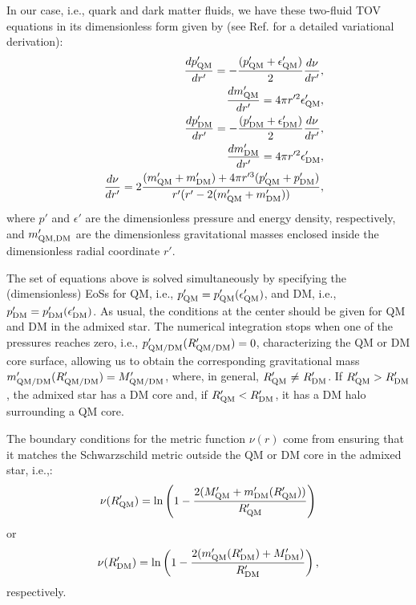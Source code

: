 \documentclass[universe,article,accept,moreauthors,pdftex]{Definitions/mdpi}
\begin{document}
In our case, i.e., quark and dark matter fluids, we have these two-fluid TOV equations in its dimensionless form given by \cite{Tolos:2015qra} (see Ref. \cite{Xiang:2013xwa} for a detailed variational derivation):
%
\begin{eqnarray}
&&\frac{dp'_{\rm QM}}{dr'}=-\frac{(p'_{\rm QM}+\epsilon'_{\rm QM})}{2}\frac{d \nu}{dr'}, \nonumber \\
&&\frac{dm'_{\rm QM}}{dr'}=4 \pi r'^2 \epsilon'_{\rm QM}, \nonumber \\
&&\frac{dp'_{\rm DM}}{dr'}=-\frac{(p'_{\rm DM}+\epsilon'_{\rm DM})}{2}\frac{d \nu}{dr'},  \\
&&\frac{dm'_{\rm DM}}{dr'}=4 \pi r'^2 \epsilon'_{\rm DM}, \nonumber \\
&&\frac{d \nu}{dr'}=2\frac{(m'_{\rm QM}+m'_{\rm DM}) + 4 \pi r'^3(p'_{\rm QM}+p'_{\rm DM})}{r'(r'-2(m'_{\rm QM}+m'_{\rm DM}))}, \nonumber
\label{eq:2TOV}
\end{eqnarray}
%
where $p'$ and $\epsilon'$ are the dimensionless pressure and energy density, respectively, and $m'_{\rm QM, DM}$ are the dimensionless gravitational masses enclosed inside the dimensionless radial coordinate $r'$. 

The set of equations above is solved simultaneously by specifying the (dimensionless) EoSs for QM, i.e., $p'_{\rm QM}=p'_{\rm QM}(\epsilon'_{\rm QM})$, and DM, i.e.,  $p'_{\rm DM}=p'_{\rm DM}(\epsilon'_{\rm DM})$. As usual, the \linebreak conditions at the center should be given for QM and DM in the admixed star. The numerical integration stops when one of the pressures reaches zero, i.e., \linebreak $p'_{\rm QM/DM}(R'_{\rm QM/DM})=0$, characterizing the QM or DM core surface, allowing us to obtain the corresponding gravitational mass $m'_{\rm QM/DM}(R'_{\rm QM/DM})=M'_{\rm QM/DM}$, where, in general, $R'_{\rm QM}{~\neq~}R'_{\rm DM}$. If $R'_{\rm QM}>R'_{\rm DM}$, the admixed star has a DM core and, if $R'_{\rm QM}<R'_{\rm DM}$, it has a DM halo surrounding a QM core.

The boundary conditions for the metric function $\nu(r)$ come from ensuring that it matches the Schwarzschild metric outside the QM or DM core in the admixed star, i.e.,:
%
\begin{equation}
\nu(R'_{\rm QM})=\ln\left(1-\frac{2(M'_{\rm QM}+m'_{\rm DM}(R'_{\rm QM}))}{R'_{\rm QM}}\right)
\label{eq:nu1} 
\end{equation}
%
or
%
\begin{equation}
\nu(R'_{\rm DM})=\ln\left(1-\frac{2(m'_{\rm QM}(R'_{\rm DM})+M'_{\rm DM})}{R'_{\rm DM}}\right), 
\label{eq:nu2}
\end{equation}
%
respectively.
  
\end{document}
